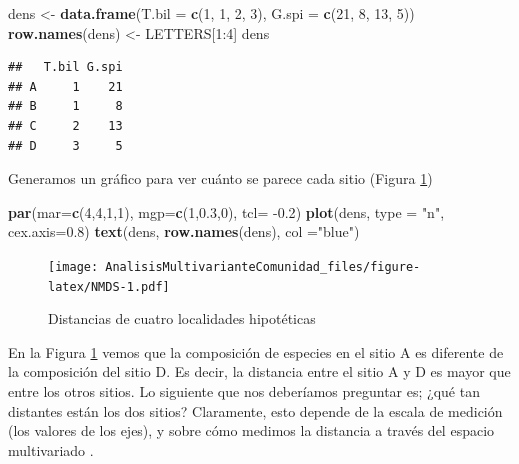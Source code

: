 \documentclass[]{book}
\newenvironment{Shaded}{\begin{snugshade}}{\end{snugshade}}
\newcommand{\KeywordTok}[1]{\textcolor[rgb]{0.13,0.29,0.53}{\textbf{{#1}}}}
\newcommand{\DataTypeTok}[1]{\textcolor[rgb]{0.13,0.29,0.53}{{#1}}}
\newcommand{\DecValTok}[1]{\textcolor[rgb]{0.00,0.00,0.81}{{#1}}}
\newcommand{\FloatTok}[1]{\textcolor[rgb]{0.00,0.00,0.81}{{#1}}}
\newcommand{\StringTok}[1]{\textcolor[rgb]{0.31,0.60,0.02}{{#1}}}
\newcommand{\NormalTok}[1]{{#1}}
\begin{document}
\begin{Shaded}
\begin{Highlighting}[]
\NormalTok{dens <-}\StringTok{ }\KeywordTok{data.frame}\NormalTok{(}\DataTypeTok{T.bil =} \KeywordTok{c}\NormalTok{(}\DecValTok{1}\NormalTok{, }\DecValTok{1}\NormalTok{, }\DecValTok{2}\NormalTok{, }\DecValTok{3}\NormalTok{), }\DataTypeTok{G.spi =} \KeywordTok{c}\NormalTok{(}\DecValTok{21}\NormalTok{, }\DecValTok{8}\NormalTok{, }\DecValTok{13}\NormalTok{, }\DecValTok{5}\NormalTok{)) }
\KeywordTok{row.names}\NormalTok{(dens) <-}\StringTok{ }\NormalTok{LETTERS[}\DecValTok{1}\NormalTok{:}\DecValTok{4}\NormalTok{]}
\NormalTok{dens}
\end{Highlighting}
\end{Shaded}

\begin{verbatim}
##   T.bil G.spi
## A     1    21
## B     1     8
## C     2    13
## D     3     5
\end{verbatim}

Generamos un gráfico para ver cuánto se parece cada sitio (Figura
\ref{fig:NMDS})

\begin{Shaded}
\begin{Highlighting}[]
\KeywordTok{par}\NormalTok{(}\DataTypeTok{mar=}\KeywordTok{c}\NormalTok{(}\DecValTok{4}\NormalTok{,}\DecValTok{4}\NormalTok{,}\DecValTok{1}\NormalTok{,}\DecValTok{1}\NormalTok{), }\DataTypeTok{mgp=}\KeywordTok{c}\NormalTok{(}\DecValTok{1}\NormalTok{,}\FloatTok{0.3}\NormalTok{,}\DecValTok{0}\NormalTok{), }\DataTypeTok{tcl=} \NormalTok{-}\FloatTok{0.2}\NormalTok{)}
\KeywordTok{plot}\NormalTok{(dens, }\DataTypeTok{type =} \StringTok{"n"}\NormalTok{, }\DataTypeTok{cex.axis=}\FloatTok{0.8}\NormalTok{) }
\KeywordTok{text}\NormalTok{(dens, }\KeywordTok{row.names}\NormalTok{(dens), }\DataTypeTok{col =}\StringTok{"blue"}\NormalTok{)}
\end{Highlighting}
\end{Shaded}

\begin{figure}[htbp]
\centering
\texttt{[image: AnalisisMultivarianteComunidad\_files/figure-latex/NMDS-1.pdf]}
\caption{\label{fig:NMDS}Distancias de cuatro localidades hipotéticas}
\end{figure}

En la Figura \ref{fig:NMDS} vemos que la composición de especies en el
sitio A es diferente de la composición del sitio D. Es decir, la
distancia entre el sitio A y D es mayor que entre los otros sitios. Lo
siguiente que nos deberíamos preguntar es; ¿qué tan distantes están los
dos sitios? Claramente, esto depende de la escala de medición (los
valores de los ejes), y sobre cómo medimos la distancia a través del
espacio multivariado \citep{Stevens2009}.
\end{document}

